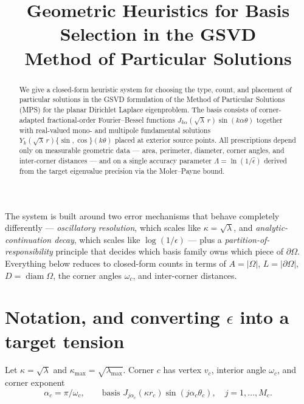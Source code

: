 \documentclass[11pt]{article}
\title{Geometric Heuristics for Basis Selection in the GSVD\\
Method of Particular Solutions}
\author{}
\date{}
\newcommand{\diam}{\operatorname{diam}}
\begin{document}
\maketitle

\begin{abstract}
\noindent
We give a closed-form heuristic system for choosing the type, count, and placement
of particular solutions in the GSVD formulation of the Method of Particular Solutions
(MPS) for the planar Dirichlet Laplace eigenproblem. The basis consists of
corner-adapted fractional-order Fourier--Bessel functions
$J_{k\alpha}(\sqrt{\lambda}\,r)\sin(k\alpha\theta)$ together with real-valued mono-
and multipole fundamental solutions $Y_k(\sqrt{\lambda}\,r)\{\sin,\cos\}(k\theta)$
placed at exterior source points. All prescriptions depend only on measurable
geometric data --- area, perimeter, diameter, corner angles, and inter-corner
distances --- and on a single accuracy parameter $\Lambda = \ln(1/\hat\epsilon)$
derived from the target eigenvalue precision via the Moler--Payne bound.
\end{abstract}

\tableofcontents

\bigskip

The system is built around two error mechanisms that behave completely differently
--- \emph{oscillatory resolution}, which scales like $\kappa=\sqrt{\lambda}$, and
\emph{analytic-continuation decay}, which scales like $\log(1/\epsilon)$ --- plus a
\emph{partition-of-responsibility} principle that decides which basis family owns
which piece of $\partial\Omega$. Everything below reduces to closed-form counts in
terms of $A=|\Omega|$, $L=|\partial\Omega|$, $D=\diam\Omega$, the corner angles
$\omega_c$, and inter-corner distances.

\section{Notation, and converting \texorpdfstring{$\epsilon$}{epsilon} into a target tension}
\label{sec:notation}

Let $\kappa=\sqrt{\lambda}$ and $\kappa_{\max}=\sqrt{\lambda_{\max}}$. Corner $c$ has
vertex $v_c$, interior angle $\omega_c$, and corner exponent
\[
  \alpha_c=\pi/\omega_c,
  \qquad
  \text{basis } J_{j\alpha_c}(\kappa r_c)\sin(j\alpha_c\theta_c),
  \quad j=1,\dots,M_c .
\]
\end{document}
